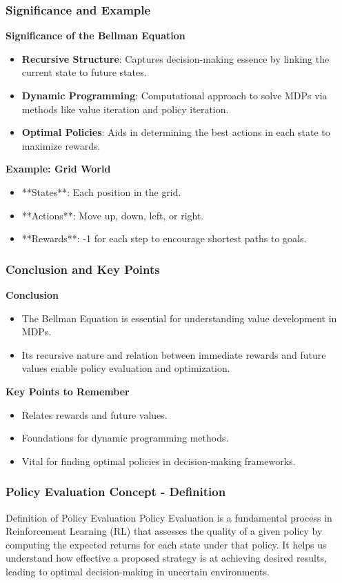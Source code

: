 \documentclass[aspectratio=169]{beamer}
\begin{document}
\begin{frame}[fragile]
    \frametitle{Significance and Example}

    \textbf{Significance of the Bellman Equation}
    \begin{itemize}
        \item \textbf{Recursive Structure}: Captures decision-making essence by linking the current state to future states.
        \item \textbf{Dynamic Programming}: Computational approach to solve MDPs via methods like value iteration and policy iteration.
        \item \textbf{Optimal Policies}: Aids in determining the best actions in each state to maximize rewards.
    \end{itemize}

    \textbf{Example: Grid World}
    \begin{itemize}
        \item **States**: Each position in the grid.
        \item **Actions**: Move up, down, left, or right.
        \item **Rewards**: -1 for each step to encourage shortest paths to goals.
    \end{itemize}
\end{frame}

\begin{frame}[fragile]
    \frametitle{Conclusion and Key Points}

    \textbf{Conclusion}
    \begin{itemize}
        \item The Bellman Equation is essential for understanding value development in MDPs.
        \item Its recursive nature and relation between immediate rewards and future values enable policy evaluation and optimization.
    \end{itemize}

    \textbf{Key Points to Remember}
    \begin{itemize}
        \item Relates rewards and future values.
        \item Foundations for dynamic programming methods.
        \item Vital for finding optimal policies in decision-making frameworks.
    \end{itemize}
\end{frame}

\begin{frame}[fragile]
  \frametitle{Policy Evaluation Concept - Definition}
  \begin{block}{Definition of Policy Evaluation}
    Policy Evaluation is a fundamental process in Reinforcement Learning (RL) that assesses the quality of a given policy by computing the expected returns for each state under that policy. It helps us understand how effective a proposed strategy is at achieving desired results, leading to optimal decision-making in uncertain environments.
  \end{block}
\end{frame}
\end{document}
